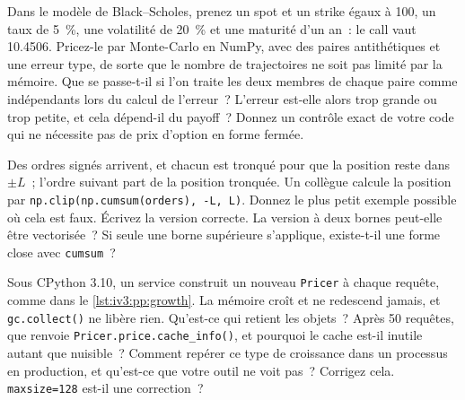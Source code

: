 \begin{question}\label{iq:iv3:python-and-pandas:34}
Dans le modèle de Black--Scholes, prenez un spot et un strike égaux à 100, un taux de 5~\%, une volatilité de 20~\% et une maturité d'un an~: le call vaut 10.4506. Pricez-le par Monte-Carlo en NumPy, avec des paires antithétiques et une erreur type, de sorte que le nombre de trajectoires ne soit pas limité par la mémoire. Que se passe-t-il si l'on traite les deux membres de chaque paire comme indépendants lors du calcul de l'erreur~? L'erreur est-elle alors trop grande ou trop petite, et cela dépend-il du payoff~? Donnez un contrôle exact de votre code qui ne nécessite pas de prix d'option en forme fermée.
\end{question}

\begin{question}\label{iq:iv3:python-and-pandas:35}
Des ordres signés arrivent, et chacun est tronqué pour que la position reste dans $\pm L$~; l'ordre suivant part de la position tronquée. Un collègue calcule la position par \texttt{np.clip(np.cumsum(orders), -L, L)}. Donnez le plus petit exemple possible où cela est faux. Écrivez la version correcte. La version à deux bornes peut-elle être vectorisée~? Si seule une borne supérieure s'applique, existe-t-il une forme close avec \texttt{cumsum}~?
\end{question}

\begin{question}\label{iq:iv3:python-and-pandas:36}
Sous CPython 3.10, un service construit un nouveau \texttt{Pricer} à chaque requête, comme dans le \cref{lst:iv3:pp:growth}. La mémoire croît et ne redescend jamais, et \texttt{gc.collect()} ne libère rien. Qu'est-ce qui retient les objets~? Après 50 requêtes, que renvoie \texttt{Pricer.price.cache\_info()}, et pourquoi le cache est-il inutile autant que nuisible~? Comment repérer ce type de croissance dans un processus en production, et qu'est-ce que votre outil ne voit pas~? Corrigez cela. \texttt{maxsize=128} est-il une correction~?
\label{lst:iv3:pp:growth}
\end{question}

